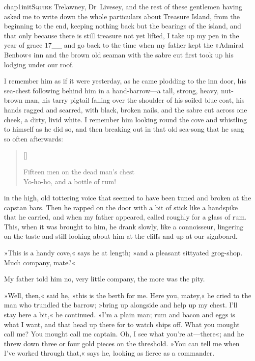 

\lettrine[lines=5,image=true,findent=2pt]{chap1initS}{quire} Trelawney, Dr~Livesey, and the rest of these gentlemen having asked me to write down the whole particulars about Treasure Island, from the beginning to the end, keeping nothing back but the bearings of the island, and that only because there is still treasure not yet lifted, I take up my pen in the year of grace 17\_\_ and go back to the time when my father kept the »Admiral Benbow« inn and the brown old seaman with the sabre cut first took up his lodging under our roof.

I remember him as if it were yesterday, as he came plodding to the inn door, his sea-chest following behind him in a hand-barrow—a tall, strong, heavy, nut-brown man, his tarry pigtail falling over the shoulder of his soiled blue coat, his hands ragged and scarred, with black, broken nails, and the sabre cut across one cheek, a dirty, livid white. I remember him looking round the cove and whistling to himself as he did so, and then breaking out in that old sea-song that he sang so often afterwards:
\settowidth{\versewidth}{Fifteen men on the dead man’s chest\longdash}
\begin{verse}[\versewidth]
\begin{altverse}
Fifteen men on the dead man’s chest\longdash\\
Yo-ho-ho, and a bottle of rum!
\end{altverse}
\end{verse}

in the high, old tottering voice that seemed to have been tuned and broken at the capstan bars. Then he rapped on the door with a bit of stick like a handspike that he carried, and when my father appeared, called roughly for a glass of rum. This, when it was brought to him, he drank slowly, like a connoisseur, lingering on the taste and still looking about him at the cliffs and up at our signboard.

»This is a handy cove,« says he at length; »and a pleasant sittyated grog-shop. Much company, mate?«

My father told him no, very little company, the more was the pity.

»Well, then,« said he, »this is the berth for me. Here you, matey,« he cried to the man who trundled the barrow; »bring up alongside and help up my chest. I'll stay here a bit,« he continued. »I'm a plain man; rum and bacon and eggs is what I want, and that head up there for to watch ships off. What you mought call me? You mought call me captain. Oh, I see what you're at—there«; and he threw down three or four gold pieces on the threshold. »You can tell me when I've worked through that,« says he, looking as fierce as a commander.

